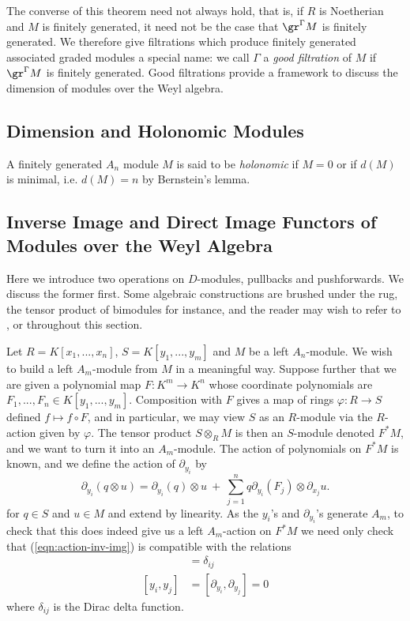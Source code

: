 The converse of this theorem need not always hold, that is, if $R$ is Noetherian and $M$ is finitely generated, it need not be the case that $\gr^{\Gamma}M$ is finitely generated. We therefore give filtrations which produce finitely generated associated graded modules a special name: we call $\Gamma$ a \emph{good filtration} of $M$ if $\gr^\Gamma M$ is finitely generated. Good filtrations provide a framework to discuss the dimension of modules over the Weyl algebra.

\subsection{Dimension and Holonomic Modules}

\begin{defn}\label{defn:holonomic}
	A finitely generated $A_n$ module $M$ is said to be \emph{holonomic} if $M = 0$ or if $d(M)$ is minimal, i.e. $d(M) = n$ by Bernstein's lemma.
\end{defn}

\subsection{Inverse Image and Direct Image Functors of Modules over the Weyl Algebra}
Here we introduce two operations on $D$-modules, pullbacks and pushforwards. We discuss the former first. Some algebraic constructions are brushed under the rug, the tensor product of bimodules for instance, and the reader may wish to refer to \cite{d-mod-primer}, \cite{d-mod_ps_rt} or \cite{ginzburg_d-mod} throughout this section.

Let $R = K[x_1,...,x_n]$, $S = K[y_1,...,y_m]$ and $M$ be a left $A_n$-module. We wish to build a left $A_m$-module from $M$ in a meaningful way. Suppose further that we are given a polynomial map $F:K^m\to K^n$ whose coordinate polynomials are $F_1,...,F_n\in K[y_1,...,y_m]$. Composition with $F$ gives a map of rings $\varphi:R\to S$ defined $f\mapsto f\circ F$, and in particular, we may view $S$ as an $R$-module via the $R$-action given by $\varphi$. The tensor product $S\otimes_R M$ is then an $S$-module denoted $F^*M$, and we want to turn it into an $A_m$-module. The action of polynomials on $F^*M$ is known, and we define the action of $\partial_{y_i}$ by
\begin{equation}\label{eqn:action-inv-img}\tag{$\ast$}
	\partial_{y_i}(q\otimes u) = \partial_{y_i}(q) \otimes u ~ + ~ \sum_{j=1}^n q\partial_{y_i}(F_j) \otimes \partial_{x_j} u.
\end{equation}
for $q\in S$ and $u\in M$ and extend by linearity. As the $y_i$'s and $\partial_{y_i}$'s generate $A_m$, to check that this does indeed give us a left $A_m$-action on $F^*M$ we need only check that (\ref{eqn:action-inv-img}) is compatible with the relations
\begin{align*}
	[\partial_{y_i}, y_j] &= \delta_{ij} \\
	[y_i,y_j] &= [\partial_{y_i},\partial_{y_j}] = 0
\end{align*}
where $\delta_{ij}$ is the Dirac delta function.

